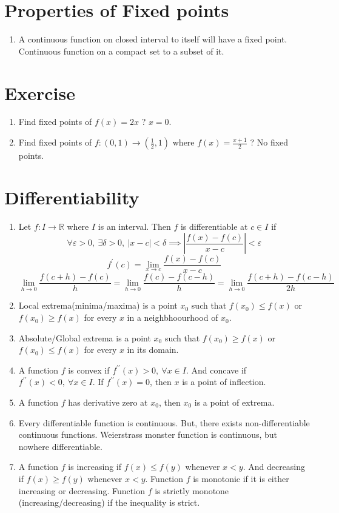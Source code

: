 \section{Properties of Fixed points}
\begin{enumerate}
	\item A continuous function on closed interval to itself will have a fixed point.
		\subitem Continuous function on a compact set to a subset of it.
\end{enumerate}

\section{Exercise}
\begin{enumerate}
	\item Find fixed points of $f(x) =2x$ ? $x = 0$.
	\item Find fixed points of $f : (0,1) \to (\frac{1}{2}, 1)$ where $f(x) = \frac{x+1}{2}$ ? No fixed points.
\end{enumerate}

\section{Differentiability}
\begin{enumerate}
	\item Let $f : I \to \mathbb{R}$ where $I$ is an interval. Then $f$ is differentiable at $c \in I$ if
		$$ \forall \varepsilon > 0,\ \exists \delta > 0,\ |x-c| < \delta \implies \left| \frac{f(x)-f(c)}{x-c} \right| < \varepsilon $$
		$$ f^\prime(c) = \lim_{x \to c} \frac{f(x)-f(c)}{x-c} $$
		$$ \lim_{h \to 0} \frac{f(c+h)-f(c)}{h} = \lim_{h \to 0} \frac{f(c)-f(c-h)}{h} = \lim_{h \to 0} \frac{f(c+h)-f(c-h)}{2h} $$
	\item Local extrema(minima/maxima) is a point $x_0$ such that $f(x_0) \le f(x)$ or $f(x_0) \ge f(x)$ for every $x$ in a neighbhoourhood of $x_0$.
	\item Absolute/Global extrema is a point $x_0$ such that $f(x_0) \ge f(x)$ or $f(x_0) \le f(x)$ for every $x$ in its domain.
	\item A function $f$ is convex if $f^{\prime\prime}(x) > 0,\ \forall x \in I$. And concave if $f^{\prime\prime}(x) < 0,\ \forall x \in I$. If $f^{\prime\prime}(x) = 0$, then $x$ is a point of inflection.
	\item A function $f$ has derivative zero at $x_0$, then $x_0$ is a point of extrema.
	\item Every differentiable function is continuous. But, there exists non-differentiable continuous functions. 
		\subitem Weierstrass monster function is continuous, but nowhere differentiable.
	\item A function $f$ is increasing if $f(x)\le f(y)$ whenever $x<y$. And decreasing if $f(x) \ge f(y)$ whenever $x<y$. Function $f$ is monotonic if it is either increasing or decreasing. Function $f$ is strictly monotone (increasing/decreasing) if the inequality is strict.
\end{enumerate}
